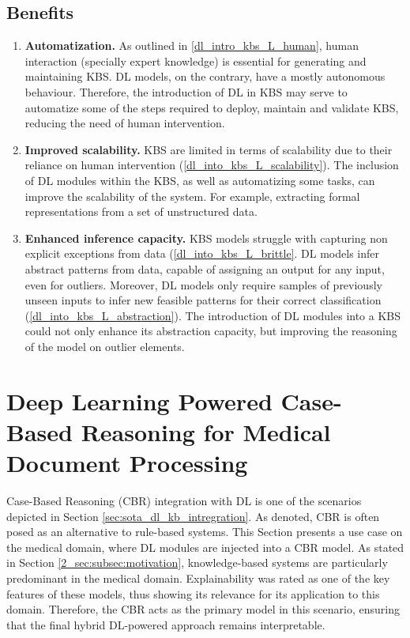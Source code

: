 \subsection*{Benefits}
\begin{enumerate} [start=1,label={\bfseries B\arabic*.}]
    \item \textbf{Automatization.}\label{dlintrokbs_B_automatization} As outlined in \ref{dl_intro_kbs_L_human}, human interaction (specially expert knowledge) is essential for generating and maintaining KBS. DL models, on the contrary, have a mostly autonomous behaviour. Therefore, the introduction of DL in KBS may serve to automatize some of the steps required to deploy, maintain and validate KBS, reducing the need of human intervention.
    
    \item \textbf{Improved scalability.}\label{dlintrokbs_B_scalability} KBS are limited in terms of scalability due to their reliance on human intervention (\ref{dl_into_kbs_L_scalability}). The inclusion of DL modules within the KBS, as well as automatizing some tasks, can improve the scalability of the system. For example, extracting formal representations from a set of unstructured data.
    
    \item \textbf{Enhanced inference capacity.}\label{dlintrokbs_B_inference} KBS models struggle with capturing non explicit exceptions from data (\ref{dl_into_kbs_L_brittle}. DL models infer abstract patterns from data, capable of assigning an output for any input, even for outliers. Moreover, DL models only require samples of previously unseen inputs to infer new feasible patterns for their correct classification (\ref{dl_into_kbs_L_abstraction}). The introduction of DL modules into a KBS could not only enhance its abstraction capacity, but improving the reasoning of the model on outlier elements.

\end{enumerate}


\section{Deep Learning Powered Case-Based Reasoning for Medical Document Processing}\label{5_sec:dl_powered_kbs_medical}
Case-Based Reasoning (CBR) integration with DL is one of the scenarios depicted in Section \ref{sec:sota_dl_kb_intregration}. As denoted, CBR is often posed as an alternative to rule-based systems. This Section presents a use case on the medical domain, where DL modules are injected into a CBR model. As stated in Section \ref{2_sec:subsec:motivation}, knowledge-based systems are particularly predominant in the medical domain. Explainability was rated as one of the key features of these models, thus showing its relevance for its application to this domain. Therefore, the CBR acts as the primary model in this scenario, ensuring that the final hybrid DL-powered approach remains interpretable. 

